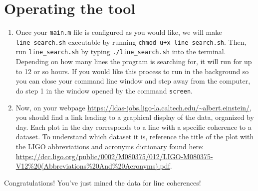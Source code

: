 \documentclass[11pt]{article}
\begin{document}
\section*{Operating the tool}
\begin{enumerate}
  \item Once your {\tt main.m} file is configured as you would like, we will make {\tt line\_search.sh} executable by running {\tt chmod u+x line\_search.sh}. Then, run {\tt line\_search.sh} by typing {\tt ./line\_search.sh} into the terminal. Depending on how many lines the program is searching for, it will run for up to 12 or so hours. If you would like this process to run in the background so you can close your command line window and step away from the computer, do step 1 in the window opened by the command {\tt screen}.
	
\item Now, on your webpage \url{https://ldas-jobs.ligo-la.caltech.edu/~albert.einstein/}, you should find a link leading to a graphical display of the data, organized by day. Each plot in the day corresponds to a line with a specific coherence to a dataset. To understand which dataset it is, reference the title of the plot with the LIGO abbreviations and acronyms dictionary found here: \url{https://dcc.ligo.org/public/0002/M080375/012/LIGO-M080375-V12\%20(Abbreviations\%20And\%20Acronyms).pdf}.
\end{enumerate}

Congratulations! You've just mined the data for line coherences!
\end{document}
